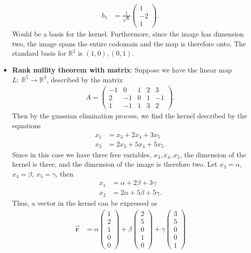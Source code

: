 \documentclass{report}
\begin{document}
\begin{itemize}
            \begin{align*}
                b_{1} &= \frac{1}{\sqrt{6}}\begin{pmatrix} 1 \\ -2 \\ 1\end{pmatrix}
            .\end{align*}
            Would be a basis for the kernel. Furthermore, since the image has dimension two, the image spans the entire codomain and the map is therefore onto. The standard basis for $\mathbb{R}^{2}$ is $(1,0), (0,1)$.
        \item \textbf{Rank nullity theorem with matrix}: Suppose we have the linear map $L:\ \mathbb{R}^{5} \to \mathbb{R}^{3}$, described by the matrix
            \begin{align*}
                A = \begin{pmatrix}-1& 0 & 1 & 2 & 3 \\ 2 & -1  & 0 & 1 & - 1 \\1 & -1 & 1 & 3 & 2 \end{pmatrix}
            .\end{align*}
            Then by the guassian elimination process, we find the kernel described by the equations
            \begin{align*}
                x_{1} &= x_{3} + 2x_{4} + 3x_{5} \\
                x_{2} &= 2x_{3} + 5x_{4} + 5x_{5}
            .\end{align*}
            \bigbreak \noindent 
            Since in this case we have three free variables, $x_{3}, x_{4}, x_{5}$, the dimension of the kernel is three, and the dimension of the image is therefore two.
            \bigbreak \noindent 
            Let $x_3 = \alpha$, $x_{4} = \beta$, $x_{5} = \gamma$, then
            \begin{align*}
                x_{1} &= \alpha + 2\beta + 3\gamma \\
                x_{2} &= 2\alpha + 5\beta + 5\gamma
            .\end{align*}
            Thus, a vector in the kernel can be expressed as 
            \begin{align*}
                \vec{\mathbf{r}} &= \alpha \begin{pmatrix} 1 \\ 2 \\ 1 \\ 0 \\ 0\end{pmatrix} + \beta\begin{pmatrix} 2 \\ 5 \\ 0 \\ 1 \\ 0\end{pmatrix} + \gamma \begin{pmatrix} 3 \\ 5 \\ 0 \\ 0 \\ 1\end{pmatrix}

\end{align*}
\end{itemize}
\end{document}

